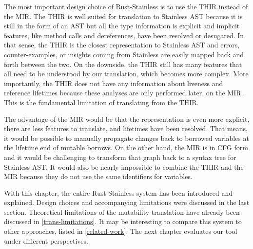 The most important design choice of Rust-Stainless is to use the THIR instead of
the MIR. The THIR is well suited for translation to Stainless AST because it is
still in the form of an AST but all the type information is explicit and
implicit features, like method calls and dereferences, have been resolved or
desugared. In that sense, the THIR is the closest representation to Stainless
AST and errors, counter-examples, or insights coming from Stainless are easily
mapped back and forth between the two. On the downside, the THIR still has many
features that all need to be understood by our translation, which becomes more
complex. More importantly, the THIR does not have any information about liveness
and reference lifetimes because these analyses are only performed later, on the
MIR. This is the fundamental limitation of translating from the THIR.

The advantage of the MIR would be that the representation is even more explicit,
there are less features to translate, and lifetimes have been resolved. That
means, it would be possible to manually propagate changes back to borrowed
variables at the lifetime end of mutable borrows. On the other hand, the MIR is
in CFG form and it would be challenging to transform that graph back to a syntax
tree for Stainless AST. It would also be nearly impossible to combine the THIR
and the MIR because they do not use the same identifiers for variables.

\hfill \break \noindent With this chapter, the entire Rust-Stainless system has
been introduced and explained. Design choices and accompanying limitations were
discussed in the last section. Theoretical limitations of the mutability
translation have already been discussed in \autoref{trans-limitations}. It may
be interesting to compare this system to other approaches, listed in
\autoref{related-work}. The next chapter evaluates our tool under different
perspectives.
